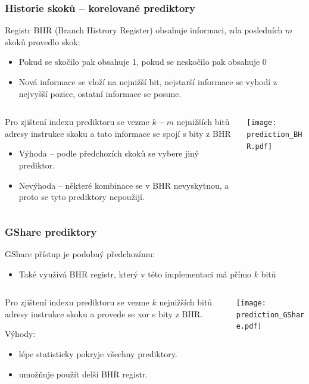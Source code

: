 \documentclass{beamer}
\begin{document}
\begin{frame}
\frametitle{Historie skoků -- korelované prediktory}

Registr BHR (Branch Histrory Register) obsahuje informaci, zda posledních $m$ skoků provedlo skok:
\begin{itemize}
\item Pokud se skočilo pak obsahuje 1, pokud se neskočilo pak obsahuje 0
\item Nová informace se vloží na nejnižší bit, nejstarší informace se vyhodí z nejvyšší pozice, ostatní informace se posune.
\end{itemize}

\begin{columns}[T]
\begin{column}{0.5\textwidth}
\small
Pro zjištení indexu prediktoru se vezme $k-m$ nejnižších bitů adresy instrukce skoku a tato informace se spojí s bity z BHR
\begin{itemize}
\item Výhoda -- podle předchozích skoků se vybere jiný prediktor.
\item Nevýhoda -- některé kombinace se v BHR nevyskytnou, a proto se tyto prediktory nepoužijí.
\end{itemize}
\end{column}
\begin{column}{0.5\textwidth}
\texttt{[image: prediction\_BHR.pdf]}
\end{column}
\end{columns}

\end{frame}

\begin{frame}
\frametitle{GShare prediktory}

GShare přístup je podobný předchozímu:
\begin{itemize}
\item Také využívá BHR registr, který v této implementaci má přímo $k$ bitů
\end{itemize}

\begin{columns}[T]
\begin{column}{0.5\textwidth}
\small
Pro zjištení indexu prediktoru se vezme $k$ nejnižších bitů adresy instrukce skoku a provede se xor s bity z BHR.

Výhody:
\begin{itemize}
\item lépe statisticky pokryje všechny prediktory.
\item umožňuje použít delší BHR registr.
\end{itemize}
\end{column}
\begin{column}{0.5\textwidth}
\texttt{[image: prediction\_GShare.pdf]}
\end{column}
\end{columns}
\end{frame}
\end{document}

